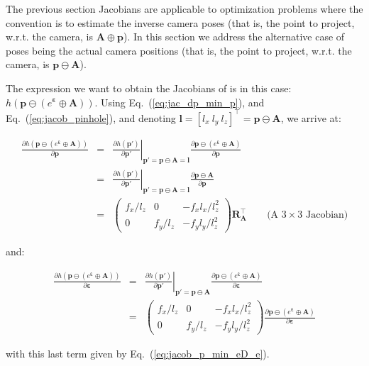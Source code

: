 \documentclass[a4paper,11pt]{report}
\newcommand{\E}{{\bm{\varepsilon}}}
\newcommand{\A}{{\mathbf{A}}}
\begin{document}
The previous section Jacobians are applicable to optimization problems
where the convention is to estimate the inverse camera poses
(that is, the point to project, w.r.t. the camera, is $\A \oplus \mathbf{p}$).
In this section we address the alternative case of poses being the actual
camera positions
(that is, the point to project, w.r.t. the camera, is $\mathbf{p} \ominus \A$).

The expression we want to obtain the Jacobians of is in this case:
$h(\mathbf{p} \ominus (e^\E \oplus \A))$.
Using Eq.~(\ref{eq:jac_dp_min_p}),
and  Eq.~(\ref{eq:jacob_pinhole}),
and denoting $\mathbf{l}=[l_x ~ l_y ~ l_z]^\top=\mathbf{p} \ominus \A$,
we arrive at:

\begin{eqnarray}
\frac{\partial h(\mathbf{p} \ominus (e^\E \oplus \A) )}{\partial \mathbf{p}}
&=&
\left. \frac{\partial h(\mathbf{p'})}{\partial \mathbf{p'}} \right|_{ \mathbf{p'} = \mathbf{p} \ominus \A = \mathbf{l} }
\frac{\partial \mathbf{p} \ominus (e^\E \oplus \A) }{\partial \mathbf{p}} \\
&=&
\left. \frac{\partial h(\mathbf{p'})}{\partial \mathbf{p'}} \right|_{ \mathbf{p'} = \mathbf{p} \ominus \A = \mathbf{l} }
\frac{\partial \mathbf{p} \ominus \A }{\partial \mathbf{p}} \\
&=&
\left(
\begin{array}{ccc}
 f_x / l_z   &    0    &  -f_x l_x / l_z^2   \\
 0 & f_y / l_z  &  -f_y l_y / l_z^2
\end{array}
\right)
\mathbf{R_A^\top}
\quad\quad \text{(A $3 \times 3$ Jacobian)}
\end{eqnarray}

\noindent and:

\begin{eqnarray}
\frac{\partial h(\mathbf{p} \ominus (e^\E \oplus \A) )}{\partial \E}
&=&
\left. \frac{\partial h(\mathbf{p'})}{\partial \mathbf{p'}} \right|_{ \mathbf{p'} = \mathbf{p} \ominus \A }
\frac{\partial \mathbf{p} \ominus (e^\E \oplus \A) }{\partial \E} \\
&=&
\left(
\begin{array}{ccc}
 f_x / l_z   &    0    &  -f_x l_x / l_z^2   \\
 0 & f_y / l_z  &  -f_y l_y / l_z^2
\end{array}
\right)
\frac{\partial \mathbf{p} \ominus (e^\E \oplus \A) }{\partial \E}
\end{eqnarray}

\noindent with this last term given by Eq.~(\ref{eq:jacob_p_min_eD_e}).




\end{document}
